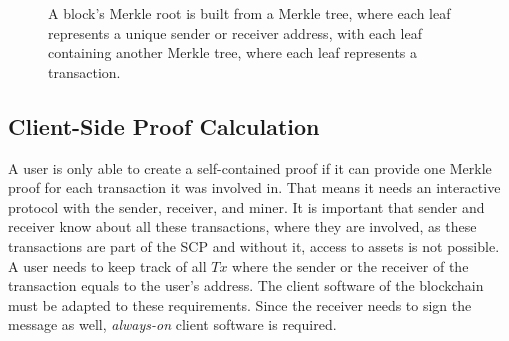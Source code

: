 \documentclass[conference]{IEEEtran}
\begin{document}
\begin{figure}[hbt]
\centering
{} 
\caption{A block's Merkle root is built from a Merkle tree, where each leaf represents a unique sender or receiver address, with each leaf containing another Merkle tree, where each leaf represents a transaction.\label{fig:MerkleTreeAggTx}}
\end{figure}

\subsection{Client-Side Proof Calculation}
A user is only able to create a self-contained proof if it can provide one Merkle proof for each transaction it was involved in. That means it needs an interactive protocol with the sender, receiver, and miner. It is important that sender and receiver know about all these transactions, where they are involved, as these transactions are part of the SCP and without it, access to assets is not possible. A user needs to keep track of all $Tx$ where the sender or the receiver of the transaction equals to the user's address. The client software of the blockchain must be adapted to these requirements. Since the receiver needs to sign the message as well, \textit{always-on} client software is required.
\end{document}

